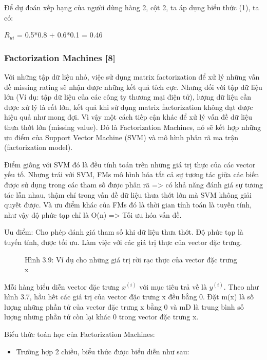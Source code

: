 \documentclass[a4paper,12pt,numbered,print,index,custombib, oneside, custommargin]{report}
\begin{document}
Để dự đoán xếp hạng của người dùng hàng 2, cột 2, ta áp dụng biểu thức (1), ta có: \par 
$R_{ui}$ = 0.5*0.8 + 0.6*0.1 = 0.46 \par

\subsubsection{Factorization Machines [8]}
Với những tập dữ liệu nhỏ, việc sử dụng matrix factorization để xử lý những vấn đề missing rating sẽ nhận được những kết quả tích cực. Nhưng đối với tập dữ liệu lớn (Ví dụ: tập dữ liệu của các công ty thương mại điện tử), lượng dữ liệu cần được xử lý là rất lớn, kết quả khi sử dụng matrix factorization không đạt được hiệu quả như mong đợi. Vì vậy một cách tiếp cận khác để xử lý vấn đề dữ liệu thưa thớt lớn (missing value). Đó là Factorization Machines, nó sẽ kết hợp những ưu điểm của Support Vector Machine (SVM) và mô hình phân rã ma trận (factorization model). \par
Điểm giống với SVM đó là đều tính toán trên những giá trị thực của các vector yếu tố. Nhưng trái với SVM, FMs mô hình hóa tất cả sự tương tác giữa các biến được sử dụng trong các tham số được phân rã => có khả năng đánh giá sự tương tác lẫn nhau, thậm chí trong vấn đề dữ liệu thưa thớt lớn mà SVM không giải quyết được. Và ưu điểm khác của FMs đó là thời gian tính toán là tuyến tính, như vậy độ phức tạp chỉ là O(n) => Tối ưu hóa vấn đề. \par
Ưu điểm:  Cho phép đánh giá tham số khi dữ liệu thưa thớt. Độ phức tạp là tuyến tính, được tối ưu. Làm việc với các giá trị thực của vector đặc trưng. \par

\begin{figure}[h]
\centering
\caption{Hình 3.9: Ví dụ cho những giá trị rời rạc thực của vector đặc trưng x}
\end{figure}		\par 

Mỗi hàng biểu diễn vector đặc trưng $x^(i)$ với mục tiêu trả về là $y^(i)$. 
Theo như hình 3.7, hầu hết các giá trị của vector đặc trưng x đều bằng 0. Đặt m(x) là số lượng những phần tử của vector đặc trưng x bằng 0 và mD là trung bình số lượng những phần tử còn lại khác 0 trong vector đặc trưng x. \par 

Biểu thức toán học của Factorization Machines: \par
\begin{itemize}
\item Trường hợp 2 chiều, biểu thức được biểu diễn như sau:
\end{itemize} \par
\end{document}
